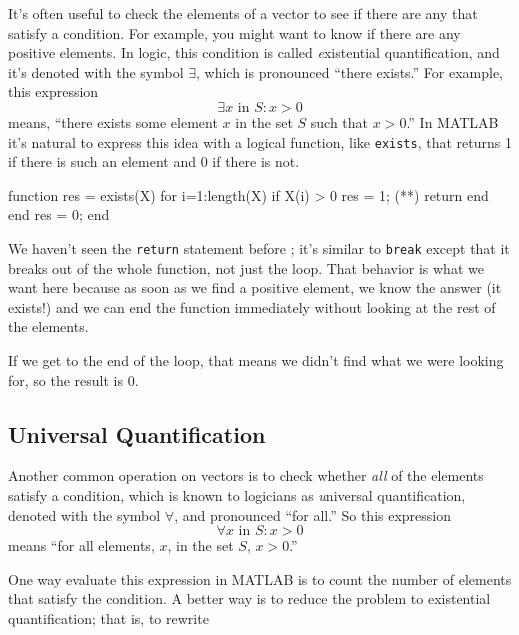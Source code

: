It's often useful to check the elements of a vector to see if there
are any that satisfy a condition.  For example, you might want to
know if there are any positive elements.  In logic, this condition
is called {\emph existential quantification}, and it's denoted with
the symbol $\exists$, which is pronounced ``there exists.''  For example,
this expression
%
\[ \exists x \mbox{~in~} S: x>0  \]
%
means, ``there exists some element $x$ in the set $S$ such that
$x>0$.''  In MATLAB it's natural to express this idea with a logical
function, like {\tt exists}, that returns 1 if there is such an
element and 0 if there is not.

\begin{code}
function res = exists(X)
    for i=1:length(X)
        if X(i) > 0
            res = 1;
(**)            return
        end
    end
    res = 0;
end
\end{code}

We haven't seen the {\tt return} statement before ; it's similar
to {\tt break} except that it breaks out of the whole function, not
just the loop.  That behavior is what we want here because as soon
as we find a positive element, we know the answer (it exists!) and
we can end the function immediately without looking at the rest
of the elements.


If we get to the end of the loop, that means we didn't find what
we were looking for, so the result is 0.

\subsection{Universal Quantification}


Another common operation on vectors is to check whether {\em all}
of the elements satisfy a condition, which is known to
logicians as {\emph universal quantification}, denoted with
the symbol $\forall$, and pronounced ``for all.''  So this
expression
%
\[ \forall x \mbox{~in~} S: x>0 \]
%
means ``for all elements, $x$, in the set $S$, $x>0$.''

One way evaluate this expression in MATLAB is to
count the number of elements that satisfy the condition.
A better way is to reduce the problem to
existential quantification; that is, to rewrite

